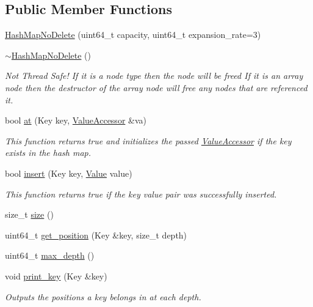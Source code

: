 \subsection*{Public Member Functions}
\begin{DoxyCompactItemize}
\item 
\hyperlink{classtervel_1_1containers_1_1wf_1_1_hash_map_no_delete_a5ccfca89ca6b98846a5f5a89e0aaea68}{Hash\+Map\+No\+Delete} (uint64\+\_\+t capacity, uint64\+\_\+t expansion\+\_\+rate=3)
\item 
\hyperlink{classtervel_1_1containers_1_1wf_1_1_hash_map_no_delete_a1a842f9ae98c2431058fca17b12a3c90}{$\sim$\+Hash\+Map\+No\+Delete} ()
\begin{DoxyCompactList}\small\item\em Not Thread Safe! If it is a node type then the node will be freed If it is an array node then the destructor of the array node will free any nodes that are referenced it. \end{DoxyCompactList}\item 
bool \hyperlink{classtervel_1_1containers_1_1wf_1_1_hash_map_no_delete_aa2a9113fdff490d4506e4fea024e6682}{at} (Key key, \hyperlink{classtervel_1_1containers_1_1wf_1_1_hash_map_no_delete_1_1_value_accessor}{Value\+Accessor} \&va)
\begin{DoxyCompactList}\small\item\em This function returns true and initializes the passed \hyperlink{classtervel_1_1containers_1_1wf_1_1_hash_map_no_delete_1_1_value_accessor}{Value\+Accessor} if the key exists in the hash map. \end{DoxyCompactList}\item 
bool \hyperlink{classtervel_1_1containers_1_1wf_1_1_hash_map_no_delete_ab7f96b858f59003d915f7398f1231f56}{insert} (Key key, \hyperlink{hash__map_2test_object_8h_ad777bf08d8e2b01df17ba5e3c51ae11f}{Value} value)
\begin{DoxyCompactList}\small\item\em This function returns true if the key value pair was successfully inserted. \end{DoxyCompactList}\item 
size\+\_\+t \hyperlink{classtervel_1_1containers_1_1wf_1_1_hash_map_no_delete_a8822f863119e3bbf5db0cfa881e3c095}{size} ()
\item 
uint64\+\_\+t \hyperlink{classtervel_1_1containers_1_1wf_1_1_hash_map_no_delete_a8f8d14cc36e7f743e87c19507c5eafcb}{get\+\_\+position} (Key \&key, size\+\_\+t depth)
\item 
uint64\+\_\+t \hyperlink{classtervel_1_1containers_1_1wf_1_1_hash_map_no_delete_aede08bd3a6c4814d79c9b1afcfbffa0b}{max\+\_\+depth} ()
\item 
void \hyperlink{classtervel_1_1containers_1_1wf_1_1_hash_map_no_delete_a91e2df240ee788980b13c521dc1617b6}{print\+\_\+key} (Key \&key)
\begin{DoxyCompactList}\small\item\em Outputs the positions a key belongs in at each depth. \end{DoxyCompactList}\end{DoxyCompactItemize}
